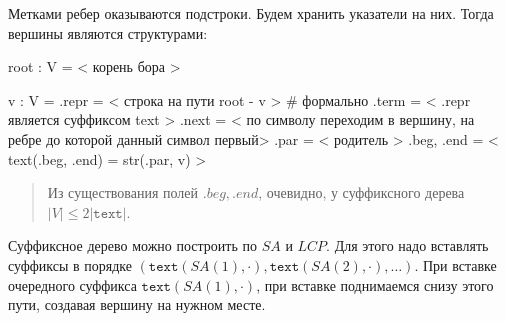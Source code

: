 \documentclass[10pt]{book}
\theoremstyle{plain}
\newcommand{\textm}{\texttt{text}}
\begin{document}
Метками ребер оказываются подстроки. Будем хранить указатели на них. Тогда
вершины являются структурами:
\begin{verbm}
  root : V = < корень бора >
  
  v : V = {
    .repr = < строка на пути root - v >  # формально
    .term = < .repr является суффиксом text >
    .next = < по символу переходим в вершину,
              на ребре до которой данный символ первый>
    .par = < родитель >
    .beg, .end = < text(.beg, .end) = str(.par, v) >
  }
\end{verbm}

\begin{quote}
  Из существования полей $.beg, .end$, очевидно, у суффиксного дерева
  $|V| \le 2|\textm|$.
\end{quote}

Суффиксное дерево можно построить по $SA$ и $LCP$. Для этого надо вставлять
суффиксы в порядке $(\textm(SA(1), \cdot), \textm(SA(2), \cdot), \ldots)$.
При вставке очередного суффикса $\textm(SA(1), \cdot)$, при вставке поднимаемся
снизу этого пути, создавая вершину на нужном месте.
\end{document}
